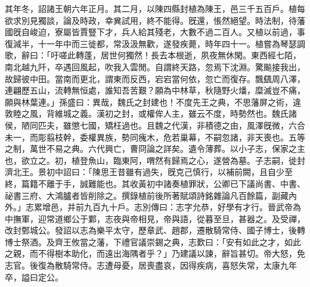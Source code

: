 \begin{pinyinscope}
其年冬，詔諸王朝六年正月。其二月，以陳四縣封植為陳王，邑三千五百戶。植每欲求別見獨談，論及時政，幸兾試用，終不能得。旣還，悵然絕望。時法制，待藩國旣自峻迫，寮屬皆賈豎下才，兵人給其殘老，大數不過二百人。又植以前過，事復減半，十一年中而三徙都，常汲汲無歡，遂發疾薨，時年四十一。植嘗為琴瑟調歌，辭曰：「吁嗟此轉蓬，居世何獨然！長去本根逝，夙夜無休閑。東西經七陌，南北越九阡，卒遇回風起，吹我入雲閒。自謂終天路，忽焉下沈淵。驚飈接我出，故歸彼中田。當南而更北，謂東而反西，宕宕當何依，忽亡而復存。飄颻周八澤，連翩歷五山，流轉無恒處，誰知吾苦艱？願為中林草，秋隨野火燔，糜滅豈不痛，願與林葉連。」孫盛曰：異哉，魏氏之封建也！不度先王之典，不思藩屏之術，違敦睦之風，背維城之義。漢初之封，或權侔人主，雖云不度，時勢然也。魏氏諸侯，陋同匹夫，雖懲七國，矯枉過也。且魏之代漢，非積德之由，風澤旣微，六合未一，而彫翦枝幹，委權異族，勢同瘣木，危若巢幕，不嗣忽諸，非天喪也。五等之制，萬世不易之典。六代興亡，曹冏論之詳矣。遺令薄葬。以小子志，保家之主也，欲立之。初，植登魚山，臨東阿，喟然有歸焉之心，遂營為墓。子志嗣，徙封濟北王。景初中詔曰：「陳思王昔雖有過失，旣克己慎行，以補前闕，且自少至終，篇籍不離于手，誠難能也。其收黃初中諸奏植罪狀，公卿已下議尚書、中書、祕書三府、大鴻臚者皆削除之。撰錄植前後所著賦頌詩銘雜論凡百餘篇，副藏內外。」志累增邑，并前九百九十戶。志別傳曰：志字允恭，好學有才行。晉武帝為中撫軍，迎常道鄉公于鄴，志夜與帝相見，帝與語，從暮至旦，甚器之。及受禪，改封鄄城公。發詔以志為樂平太守，歷章武、趙郡，遷散騎常侍、國子博士，後轉博士祭酒。及齊王攸當之藩，下禮官議崇錫之典，志歎曰：「安有如此之才，如此之親，而不得樹本助化，而遠出海隅者乎？」乃建議以諫，辭旨甚切。帝大怒，免志官。後復為散騎常侍。志遭母憂，居喪盡哀，因得疾病，喜怒失常，太康九年卒，謚曰定公。


\end{pinyinscope}